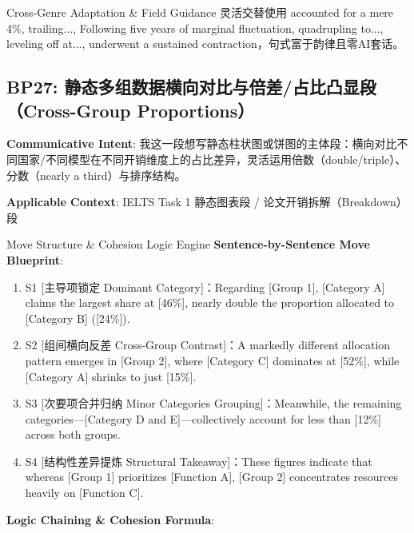 \endgroup
\vspace{4pt}
\begin{TipBox}{Cross-Genre Adaptation \& Field Guidance}
灵活交替使用 accounted for a mere 4\%, trailing..., Following five years of marginal fluctuation, quadrupling to..., leveling off at..., underwent a sustained contraction，句式富于韵律且零AI套话。
\end{TipBox}
\vspace{8pt}
\subsection{BP27: 静态多组数据横向对比与倍差/占比凸显段（Cross-Group Proportions）}\label{sec:bp:BP27}
\noindent\textbf{\color{AcadNavy}Communicative Intent}: 我这一段想写静态柱状图或饼图的主体段：横向对比不同国家/不同模型在不同开销维度上的占比差异，灵活运用倍数（double/triple）、分数（nearly a third）与排序结构。\par\vspace{2pt}
\noindent\textbf{\color{AcadSlate}Applicable Context}: IELTS Task 1 静态图表段 / 论文开销拆解（Breakdown）段\par\vspace{4pt}
\begin{ConceptBox}{Move Structure \& Cohesion Logic Engine}
\textbf{Sentence-by-Sentence Move Blueprint}:
\begin{enumerate}[label=\textbf{\color{AcadNavy}S\arabic*.}, leftmargin=2em, itemsep=2pt]
  \item S1 [主导项锁定 Dominant Category]：Regarding [Group 1], [Category A] claims the largest share at [46\%], nearly double the proportion allocated to [Category B] ([24\%]).
  \item S2 [组间横向反差 Cross-Group Contrast]：A markedly different allocation pattern emerges in [Group 2], where [Category C] dominates at [52\%], while [Category A] shrinks to just [15\%].
  \item S3 [次要项合并归纳 Minor Categories Grouping]：Meanwhile, the remaining categories---[Category D and E]---collectively account for less than [12\%] across both groups.
  \item S4 [结构性差异提炼 Structural Takeaway]：These figures indicate that whereas [Group 1] prioritizes [Function A], [Group 2] concentrates resources heavily on [Function C].
\end{enumerate}\par\vspace{4pt}
\textbf{Logic Chaining \& Cohesion Formula}:\par{}
\end{ConceptBox}
